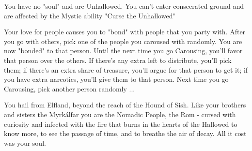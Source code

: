 {    
    
    You have no "soul" and are Unhallowed. You can't enter consecrated ground and are affected by the Mystic ability "Curse the Unhallowed"


    \cbreak


    Your love for people causes you to "bond" with people that you party with.  After you go  with others, pick one of the people you caroused with randomly. You are now "bonded" to that person.  Until the next time you go Carousing, you'll favor that person over the others. If there's any extra  left to distribute, you'll pick them; if there's an extra share of treasure, you'll argue for that person to get it; if you have extra narcotics, you'll give them to that person.  Next time you go Carousing, pick another person randomly ...



 


  \newpage





  
  You hail from Elfland, beyond the reach of the Hound of Sish.  Like your brothers and sisters the Myrkálfar you are the Nomadic People, the Rom - cursed with curiosity and infected with the fire that burns in the hearts of the Hallowed to know more, to see the passage of time, and to breathe the air of decay.  All it cost was your soul.  

}
